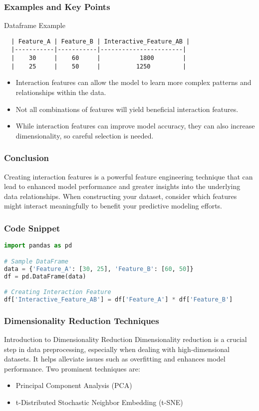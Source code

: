 \documentclass[aspectratio=169]{beamer}
\begin{document}
\begin{frame}[fragile]
  \frametitle{Examples and Key Points}
  \begin{block}{Dataframe Example}
  \begin{verbatim}
  | Feature_A | Feature_B | Interactive_Feature_AB |
  |-----------|-----------|-----------------------|
  |    30     |    60     |           1800        |
  |    25     |    50     |          1250         |
  \end{verbatim}
  \end{block}

  \begin{itemize}
    \item Interaction features can allow the model to learn more complex patterns and relationships within the data.
    \item Not all combinations of features will yield beneficial interaction features.
    \item While interaction features can improve model accuracy, they can also increase dimensionality, so careful selection is needed.
  \end{itemize}
\end{frame}

\begin{frame}[fragile]
  \frametitle{Conclusion}
  Creating interaction features is a powerful feature engineering technique that can lead to enhanced model performance and greater insights into the underlying data relationships. When constructing your dataset, consider which features might interact meaningfully to benefit your predictive modeling efforts.
\end{frame}

\begin{frame}[fragile]
  \frametitle{Code Snippet}
  \begin{lstlisting}[language=Python]
import pandas as pd

# Sample DataFrame
data = {'Feature_A': [30, 25], 'Feature_B': [60, 50]}
df = pd.DataFrame(data)

# Creating Interaction Feature
df['Interactive_Feature_AB'] = df['Feature_A'] * df['Feature_B']
  \end{lstlisting}
\end{frame}

\begin{frame}[fragile]
    \frametitle{Dimensionality Reduction Techniques}
    \begin{block}{Introduction to Dimensionality Reduction}
        Dimensionality reduction is a crucial step in data preprocessing, especially when dealing with high-dimensional datasets. 
        It helps alleviate issues such as overfitting and enhances model performance. 
        Two prominent techniques are:
        \begin{itemize}
            \item Principal Component Analysis (PCA)
            \item t-Distributed Stochastic Neighbor Embedding (t-SNE)
        \end{itemize}
    \end{block}
\end{frame}
\end{document}
